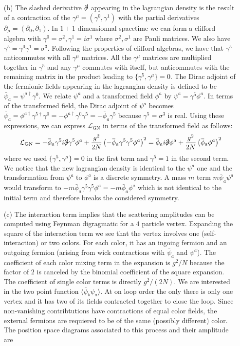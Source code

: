 \documentclass[10pt, a4paper]{article}
\begin{document}
\begin{enumerate}
  \item[(b)] The slashed derivative $\slashed{\partial}$ appearing in the lagrangian density is the result of a contraction of the $\gamma^\mu = (\gamma^0, \gamma^1)$ with the partial derivatives $\partial_\mu = (\partial_0, \partial_1)$. In $1+1$ dimensionnal spacetime we can form a clifford algebra with $\gamma^0 = \sigma^2, \gamma^1 = i \sigma^1$ where $\sigma^2, \sigma^1$ are Pauli matrices. We also have $\gamma^5 = \gamma^0 \gamma^1 = \sigma^3$. Following the properties of clifford algebras, we have that $\gamma^5$ anticommutes with all $\gamma^\mu$ matrices. All the $\gamma^\mu$ matrices are multiplied together in $\gamma^5$ and any $\gamma^\mu$ commutes with itself, but anticommutes with the remaining matrix in the product leading to $\{\gamma^5, \gamma^\mu\} = 0$. The Dirac adjoint of the fermionic fields appearing in the lagrangian density is defined to be $\bar{\psi}_a = \psi^{a\dagger} \gamma^0$.  We relate $\psi^{a}$ and a transformed field $\phi^{a}$ by $\psi^{a} = \gamma^5 \phi^{a}$. In terms of the transformed field, the  Dirac adjoint of $\psi^{a}$ becomes $\bar{\psi}_a = \phi^{a\dagger}\gamma^{5\dagger} \gamma^0 = -\phi^{a\dagger} \gamma^0 \gamma^{5} = -\bar{\phi}_a \gamma^5$ because $\gamma^5 = \sigma^3$ is real. Using these expressions, we can express $\mathcal{L}_{\mathrm{GN}}$ in terms of the transformed field as follows: 
  \begin{align*}
    \mathcal{L}_{\mathrm{GN}}=-\bar{\phi}_a \gamma^5 i \slashed{\partial} \gamma^5 \phi^a+\frac{g^2}{2 N}\left(-\bar{\phi}_a \gamma^5 \gamma^5 \phi^a\right)^2 = \bar{\phi}_a i \slashed{\partial}  \phi^a+\frac{g^2}{2 N}\left(\bar{\phi}_a \phi^a\right)^2  
  \end{align*}
  where we used $\{\gamma^5, \gamma^\mu\} = 0$ in the first term and $\gamma^5 = 1$ in the second term. We notice that the new lagrangian density is identical to the $\psi^a$ one and the transformation from $\psi^a$ to $\phi^a$ is a discrete symmetry. A mass $m$ term $m \bar{\psi}_a \psi^a$ would transform to $-m \bar{\phi}_a \gamma^5 \gamma^5 \phi^a = -m \bar{\phi}_a \phi^a$ which is not identical to the initial term and therefore breaks the considered symmetry. 
  \item[(c)] The interaction term implies that the scattering amplitudes can be computed using Feynman digragmatic for a $4$ particle vertex. Expanding the square of the interaction term we see that the vertex involves one (self-interaction) or two colors. For each color, it has an ingoing fermion and an outgoing fermion (arising from wick contractions with $\bar{\psi}_a$ and $\psi^a$). The coefficient of each color mixing term in the expansion is $g^2/N$ because the factor of $2$ is canceled by the binomial coefficient of the square expansion. The coefficient of single color terms is directly $g^2/(2N)$. We are interested in the two point function $\langle \bar{\psi}_b \psi_a\rangle$. At on loop order the only there is only one vertex and it has two of its fields contracted together to close the loop. Since non-vanishing contribtutions have contractions of equal color fields, the external fermions are requiered to be of the same (possibly different) color. The position space diagrams associated to this process and their amplitude are 

\end{enumerate}
\end{document}
